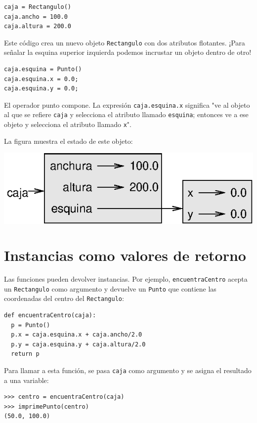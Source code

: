 \beforeverb
\begin{verbatim}
caja = Rectangulo()
caja.ancho = 100.0
caja.altura = 200.0
\end{verbatim}
\afterverb
%
Este código crea un nuevo objeto \texttt{Rectangulo} con dos atributos flotantes.
¡Para señalar la esquina superior izquierda podemos incrustar un objeto dentro de otro!

\beforeverb
\begin{verbatim}
caja.esquina = Punto()
caja.esquina.x = 0.0;
caja.esquina.y = 0.0;
\end{verbatim}
\afterverb
%
El operador punto compone. La expresión \texttt{caja.esquina.x} significa
"ve al objeto al que se refiere \texttt{caja} y selecciona el atributo llamado
\texttt{esquina}; entonces ve a ese objeto y selecciona el atributo llamado
\texttt{x}".

La figura muestra el estado de este objeto:

\beforefig
\centerline{\includegraphics{illustrations/rectangle.eps}}
\afterfig


\section{Instancias como valores de retorno}

Las funciones pueden devolver instancias. Por ejemplo, \texttt{encuentraCentro}
acepta un \texttt{Rectangulo} como argumento y devuelve un \texttt{Punto} que
contiene las coordenadas del centro del \texttt{Rectangulo}:

\beforeverb
\begin{verbatim}
def encuentraCentro(caja):
  p = Punto()
  p.x = caja.esquina.x + caja.ancho/2.0
  p.y = caja.esquina.y + caja.altura/2.0
  return p
\end{verbatim}
\afterverb
%
Para llamar a esta función, se pasa \texttt{caja} como argumento y se asigna el resultado
a una variable:

\beforeverb
\begin{verbatim}
>>> centro = encuentraCentro(caja)
>>> imprimePunto(centro)
(50.0, 100.0)
\end{verbatim}
\afterverb
%

